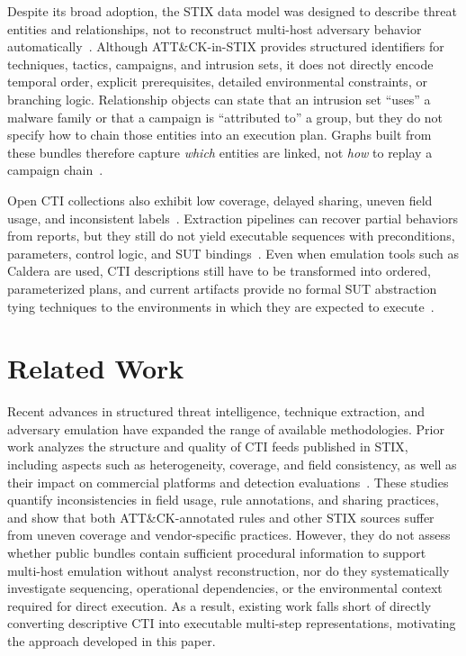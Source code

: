 \documentclass[sigconf]{acmart}
\newcommand{\stix}{STIX\xspace}
\newcommand{\attack}{ATT\&CK\xspace}
\newcommand{\caldera}{Caldera\xspace}
\begin{document}
Despite its broad adoption, the \stix{} data model was designed to describe threat entities and relationships, not to reconstruct multi-host adversary behavior automatically~\cite{stixspec}. Although \attack{}-in-\stix{} provides structured identifiers for techniques, tactics, campaigns, and intrusion sets, it does not directly encode temporal order, explicit prerequisites, detailed environmental constraints, or branching logic. Relationship objects can state that an intrusion set ``uses'' a malware family or that a campaign is ``attributed to'' a group, but they do not specify how to chain those entities into an execution plan. Graphs built from these bundles therefore capture \emph{which} entities are linked, not \emph{how} to replay a campaign chain~\cite{strom2018mitre,10117505,savat2021extractor}.

Open CTI collections also exhibit low coverage, delayed sharing, uneven field usage, and inconsistent labels~\cite{jin2024sharing,vermeer2022evolution}. Extraction pipelines can recover partial behaviors from reports, but they still do not yield executable sequences with preconditions, parameters, control logic, and SUT bindings~\cite{savat2021extractor,10117505,marvin2025sokttp,xu2024intelex,cheng2025ctinexus,deng2024raconteur}. Even when emulation tools such as \caldera{} are used, CTI descriptions still have to be transformed into ordered, parameterized plans, and current artifacts provide no formal SUT abstraction tying techniques to the environments in which they are expected to execute~\cite{apurva2024mitre,10.1145/3634737.3645012,singer2025incalmo}.

\section{Related Work}
\label{sec:related}

Recent advances in structured threat intelligence, technique extraction, and adversary emulation have expanded the range of available methodologies. Prior work analyzes the structure and quality of CTI feeds published in \stix{}, including aspects such as heterogeneity, coverage, and field consistency, as well as their impact on commercial platforms and detection evaluations~\cite{stixspec,jin2024sharing,10117505,strom2018mitre,apurva2024mitre,10.1145/3634737.3645012,vermeer2022evolution}. These studies quantify inconsistencies in field usage, rule annotations, and sharing practices, and show that both \attack{}-annotated rules and other \stix{} sources suffer from uneven coverage and vendor-specific practices. However, they do not assess whether public bundles contain sufficient procedural information to support multi-host emulation without analyst reconstruction, nor do they systematically investigate sequencing, operational dependencies, or the environmental context required for direct execution. As a result, existing work falls short of directly converting descriptive CTI into executable multi-step representations, motivating the approach developed in this paper.
\end{document}
